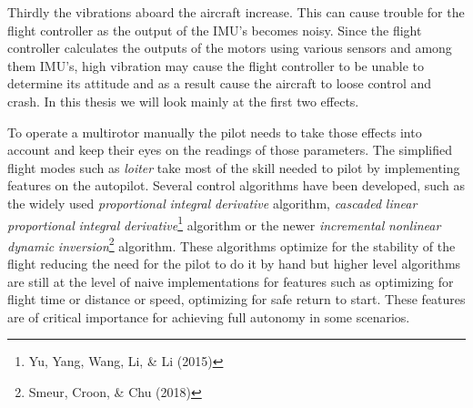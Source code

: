\documentclass[12pt,oneside]{reedthesis}
\theoremstyle{definition}
\theoremstyle{definition}
\theoremstyle{definition}
\theoremstyle{remark}
\begin{document}
Thirdly the vibrations aboard the aircraft increase. This can cause
trouble for the flight controller as the output of the IMU's becomes
noisy. Since the flight controller calculates the outputs of the motors
using various sensors and among them IMU's, high vibration may cause the
flight controller to be unable to determine its attitude and as a result
cause the aircraft to loose control and crash. In this thesis we will
look mainly at the first two effects.

To operate a multirotor manually the pilot needs to take those effects
into account and keep their eyes on the readings of those parameters.
The simplified flight modes such as \emph{loiter} take most of the skill
needed to pilot by implementing features on the autopilot. Several
control algorithms have been developed, such as the widely used
\emph{proportional} \emph{integral} \emph{derivative} algorithm,
\emph{cascaded} \emph{linear} \emph{proportional} \emph{integral}
\emph{derivative}\footnote{Yu, Yang, Wang, Li, \& Li (2015)} algorithm
or the newer \emph{incremental} \emph{nonlinear} \emph{dynamic}
\emph{inversion}\footnote{Smeur, Croon, \& Chu (2018)} algorithm. These
algorithms optimize for the stability of the flight reducing the need
for the pilot to do it by hand but higher level algorithms are still at
the level of naive implementations for features such as optimizing for
flight time or distance or speed, optimizing for safe return to start.
These features are of critical importance for achieving full autonomy in
some scenarios.
\end{document}
